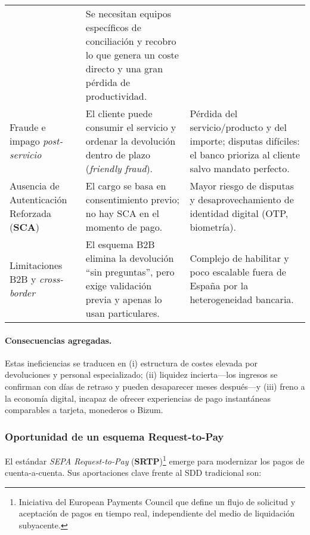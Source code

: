 \begin{table}[hbt]
\begin{tabularx}{\textwidth}{
     >{\raggedright\arraybackslash}p{2.9cm}
     X
     >{\raggedright\arraybackslash}p{3.7cm}
  }
      & Se necesitan equipos específicos de conciliación y recobro lo que genera un coste directo y una gran pérdida de productividad. \\
    \addlinespace
    Fraude e impago \emph{post-servicio}
      & El cliente puede consumir el servicio y ordenar la devolución dentro de plazo (\emph{friendly fraud}).
      & Pérdida del servicio/producto y del importe; disputas difíciles: el banco prioriza al cliente salvo mandato perfecto. \\
    \addlinespace
    Ausencia de Autenticación Reforzada (\textbf{SCA})\footnotemark
      & El cargo se basa en consentimiento previo; no hay SCA en el momento de pago.
      & Mayor riesgo de disputas y desaprovechamiento de identidad digital (OTP, biometría). \\
    \addlinespace
    Limitaciones B2B y \emph{cross-border}
      & El esquema B2B elimina la devolución “sin preguntas”, pero exige validación previa y apenas lo usan particulares.
      & Complejo de habilitar y poco escalable fuera de España por la heterogeneidad bancaria. \\
    \bottomrule
  \end{tabularx}
\end{table}



  \vfill      %
\newpage    %


\paragraph{Consecuencias agregadas.} Estas ineficiencias se traducen en (i) estructura de costes elevada por devoluciones y personal especializado; (ii) liquidez incierta—los ingresos se confirman con días de retraso y pueden desaparecer meses después—y (iii) freno a la economía digital, incapaz de ofrecer experiencias de pago instantáneas comparables a tarjeta, monederos o Bizum.

\subsubsection{Oportunidad de un esquema Request-to-Pay}
El estándar \textit{SEPA Request-to-Pay} (\textbf{SRTP})\footnote{Iniciativa del European Payments Council que define un flujo de solicitud y aceptación de pagos en tiempo real, independiente del medio de liquidación subyacente.} emerge para modernizar los pagos de cuenta-a-cuenta. Sus aportaciones clave frente al SDD tradicional son:

